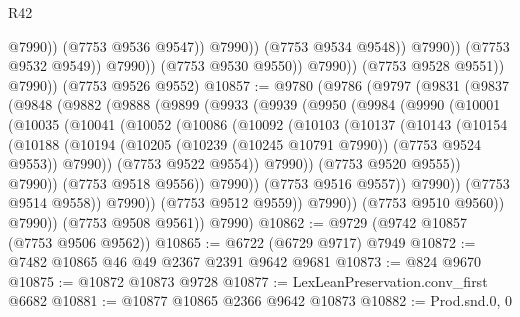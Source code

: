 \begin{lexlean}{R42}
\begin{coremodule}
{                                      @7990))
                                  (@7753 @9536 @9547))
                                @7990))
                            (@7753 @9534 @9548))
                          @7990))
                      (@7753 @9532 @9549))
                    @7990))
                (@7753 @9530 @9550))
              @7990))
          (@7753 @9528 @9551))
        @7990))
    (@7753 @9526 @9552)
@10857 := @9780
    (@9786
      (@9797
        (@9831
          (@9837
            (@9848
              (@9882
                (@9888
                  (@9899
                    (@9933
                      (@9939
                        (@9950
                          (@9984
                            (@9990
                              (@10001
                                (@10035
                                  (@10041
                                    (@10052
                                      (@10086
                                        (@10092
                                          (@10103
                                            (@10137
                                              (@10143
                                                (@10154
                                                  (@10188
                                                    (@10194
                                                      (@10205
                                                        (@10239 (@10245 @10791 @7990))
                                                        (@7753 @9524 @9553))
                                                      @7990))
                                                  (@7753 @9522 @9554))
                                                @7990))
                                            (@7753 @9520 @9555))
                                          @7990))
                                      (@7753 @9518 @9556))
                                    @7990))
                                (@7753 @9516 @9557))
                              @7990))
                          (@7753 @9514 @9558))
                        @7990))
                    (@7753 @9512 @9559))
                  @7990))
              (@7753 @9510 @9560))
            @7990))
        (@7753 @9508 @9561))
      @7990)
@10862 := @9729 (@9742 @10857 (@7753 @9506 @9562))
@10865 := @6722 (@6729 @9717) @7949
@10872 := @7482 @10865 @46 @49 @2367 @2391 @9642 @9681
@10873 := @824 @9670
@10875 := @10872 @10873 @9728
@10877 := LexLeanPreservation.conv_first @6682
@10881 := @10877 @10865 @2366 @9642 @10873
@10882 := Prod.snd.{0, 0}
}
\end{coremodule}
\end{lexlean}
